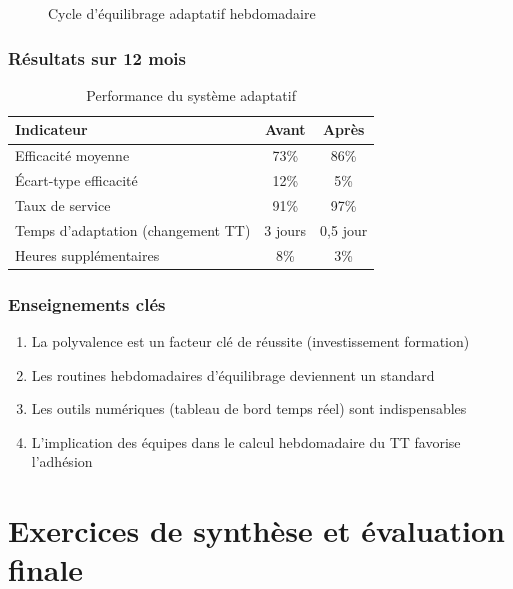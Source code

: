 \documentclass[12pt,a4paper]{article}
\begin{document}
\begin{center}
\begin{figure}[H]
\caption{Cycle d'équilibrage adaptatif hebdomadaire}
\label{fig:adaptatif}
\end{figure}

\subsubsection{Résultats sur 12 mois}

\begin{table}[H]
\centering
\caption{Performance du système adaptatif}
\label{tab:cas2_resultats}
\begin{tabular}{|l|c|c|}
\hline
\textbf{Indicateur} & \textbf{Avant} & \textbf{Après} \\ \hline
Efficacité moyenne & 73\% & 86\% \\
Écart-type efficacité & 12\% & 5\% \\
Taux de service & 91\% & 97\% \\
Temps d'adaptation (changement TT) & 3 jours & 0,5 jour \\
Heures supplémentaires & 8\% & 3\% \\
\hline
\end{tabular}
\end{table}

\subsubsection{Enseignements clés}
\begin{enumerate}
    \item La polyvalence est un facteur clé de réussite (investissement formation)
    \item Les routines hebdomadaires d'équilibrage deviennent un standard
    \item Les outils numériques (tableau de bord temps réel) sont indispensables
    \item L'implication des équipes dans le calcul hebdomadaire du TT favorise l'adhésion
\end{enumerate}

\section{Exercices de synthèse et évaluation finale}


\end{center}
\end{document}

